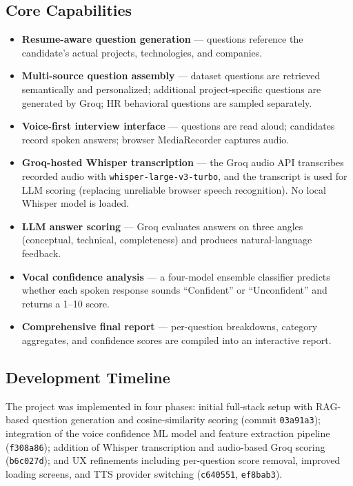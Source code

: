 \documentclass[12pt,a4paper]{article}
\begin{document}
\subsection{Core Capabilities}
\begin{itemize}[leftmargin=1.5em]
  \item \textbf{Resume-aware question generation} --- questions reference the candidate's actual projects, technologies, and companies.
  \item \textbf{Multi-source question assembly} --- dataset questions are retrieved semantically and personalized; additional project-specific questions are generated by Groq; HR behavioral questions are sampled separately.
  \item \textbf{Voice-first interview interface} --- questions are read aloud; candidates record spoken answers; browser MediaRecorder captures audio.
  \item \textbf{Groq-hosted Whisper transcription} --- the Groq audio API transcribes recorded audio with \texttt{whisper-large-v3-turbo}, and the transcript is used for LLM scoring (replacing unreliable browser speech recognition). No local Whisper model is loaded.
  \item \textbf{LLM answer scoring} --- Groq evaluates answers on three angles (conceptual, technical, completeness) and produces natural-language feedback.
  \item \textbf{Vocal confidence analysis} --- a four-model ensemble classifier predicts whether each spoken response sounds ``Confident'' or ``Unconfident'' and returns a 1--10 score.
  \item \textbf{Comprehensive final report} --- per-question breakdowns, category aggregates, and confidence scores are compiled into an interactive report.
\end{itemize}

\subsection{Development Timeline}
The project was implemented in four phases: initial full-stack setup with RAG-based question generation and cosine-similarity scoring (commit \texttt{03a91a3}); integration of the voice confidence ML model and feature extraction pipeline (\texttt{f308a86}); addition of Whisper transcription and audio-based Groq scoring (\texttt{b6c027d}); and UX refinements including per-question score removal, improved loading screens, and TTS provider switching (\texttt{c640551}, \texttt{ef8bab3}).
\end{document}
